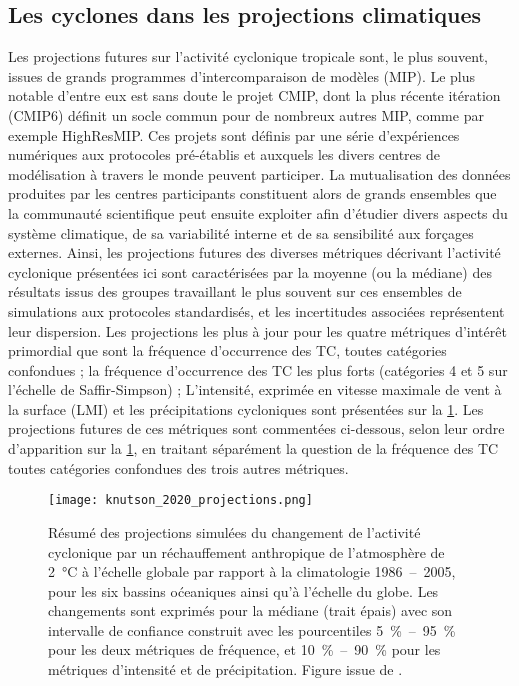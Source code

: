 \documentclass[../main.tex]{subfiles}
\begin{document}
\subsection{Les cyclones dans les projections climatiques}\label{sec:projections_futures}

Les projections futures sur l'activité cyclonique tropicale sont, le plus souvent, issues de grands programmes d'intercomparaison de modèles (MIP). Le plus
notable d'entre eux est sans doute le projet CMIP, dont la plus récente itération (CMIP6) définit un socle commun pour de nombreux autres MIP, comme par exemple
HighResMIP. Ces projets sont définis par une série d'expériences numériques aux protocoles pré-établis et auxquels les divers centres de modélisation à travers
le monde peuvent participer. La mutualisation des données produites par les centres participants constituent alors de grands ensembles que la communauté
scientifique peut ensuite exploiter afin d'étudier divers aspects du système climatique, de sa variabilité interne et de sa sensibilité aux forçages externes.
Ainsi, les projections futures des diverses métriques décrivant l'activité cyclonique présentées ici sont caractérisées par la moyenne (ou la médiane) des
résultats issus des groupes travaillant le plus souvent sur ces ensembles de simulations aux protocoles standardisés, et les incertitudes associées représentent
leur dispersion. Les projections les plus à jour pour les quatre métriques d'intérêt primordial que sont la fréquence d'occurrence des TC, toutes catégories
confondues ; la fréquence d'occurrence des TC les plus forts (catégories 4 et 5 sur l'échelle de Saffir-Simpson) ; L'intensité, exprimée en vitesse maximale de
vent à la surface (LMI) et les précipitations cycloniques sont présentées sur la \cref{fig:projections_TC}. Les projections futures de ces métriques sont
commentées ci-dessous, selon leur ordre d'apparition sur la \cref{fig:projections_TC}, en traitant séparément la question de la fréquence des TC toutes
catégories confondues des trois autres métriques.
%
\begin{figure}[tb]
    \centering
    \texttt{[image: knutson\_2020\_projections.png]}
    \caption{Résumé des projections simulées du changement de l'activité cyclonique par un réchauffement anthropique de l'atmosphère de \SI{2}{\degreeCelsius} à
        l'échelle globale par rapport à la climatologie \num{1986}~--~\num{2005}, pour les six bassins oćeaniques ainsi qu'à l'échelle du globe. Les changements
        sont exprimés pour la médiane (trait épais) avec son intervalle de confiance construit avec les pourcentiles \SI{5}{\percent}~--~\SI{95}{\percent} pour
        les deux métriques de fréquence, et \SI{10}{\percent}~--~\SI{90}{\percent} pour les métriques d'intensité et de précipitation. Figure issue de
        \cite{knutson_tropical_2020}.}
    \label{fig:projections_TC}
\end{figure}
\end{document}
